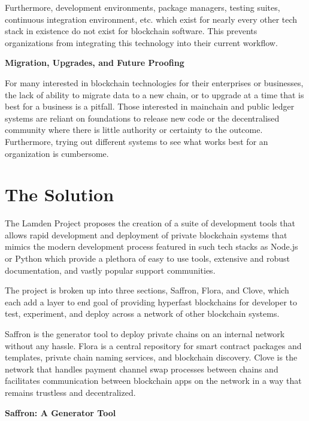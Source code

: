 \documentclass{%
	article}
\begin{document}
Furthermore, development environments, package managers, testing suites, continuous integration environment, etc. which exist for nearly every other tech stack in existence do not exist for blockchain software. This prevents organizations from integrating this technology into their current workflow.

\begin{center}
\textbf{Migration, Upgrades, and Future Proofing}
\end{center}

For many interested in blockchain technologies for their enterprises or businesses, the lack of ability to migrate data to a new chain, or to upgrade at a time that is best for a business is a pitfall. Those interested in mainchain and public ledger systems are reliant on foundations to release new code or the decentralised community where there is little authority or certainty to the outcome. Furthermore, trying out different systems to see what works best for an organization is cumbersome.

\section{The Solution}

The Lamden Project proposes the creation of a suite of development tools that allows rapid development and deployment of private blockchain systems that mimics the modern development process featured in such tech stacks as Node.js or Python which provide a plethora of easy to use tools, extensive and robust documentation, and vastly popular support communities.

The project is broken up into three sections, Saffron, Flora, and Clove, which each add a layer to end goal of providing hyperfast blockchains for developer to test, experiment, and deploy across a network of other blockchain systems.

Saffron is the generator tool to deploy private chains on an internal network without any hassle. Flora is a central repository for smart contract packages and templates, private chain naming services, and blockchain discovery. Clove is the network that handles payment channel swap processes between chains and facilitates communication between blockchain apps on the network in a way that remains trustless and decentralized.

\begin{center}
\textbf{Saffron: A Generator Tool}
\end{center}
\end{document}
